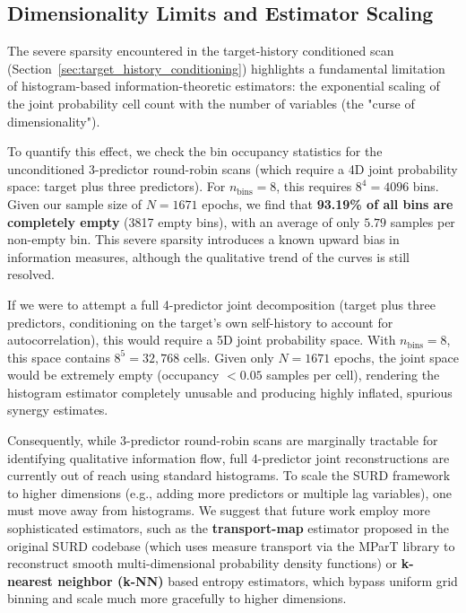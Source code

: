 \documentclass[fleqn,usenatbib]{mnras}
\begin{document}
\subsection{Dimensionality Limits and Estimator Scaling}
\label{sec:dimensionality_limits}

The severe sparsity encountered in the target-history conditioned scan (Section~\ref{sec:target_history_conditioning}) highlights a fundamental limitation of histogram-based information-theoretic estimators: the exponential scaling of the joint probability cell count with the number of variables (the "curse of dimensionality"). 

To quantify this effect, we check the bin occupancy statistics for the unconditioned 3-predictor round-robin scans (which require a 4D joint probability space: target plus three predictors). For $n_{\mathrm{bins}} = 8$, this requires $8^4 = 4096$ bins. Given our sample size of $N = 1671$ epochs, we find that \textbf{93.19\% of all bins are completely empty} (3817 empty bins), with an average of only $5.79$ samples per non-empty bin. This severe sparsity introduces a known upward bias in information measures, although the qualitative trend of the curves is still resolved.

If we were to attempt a full 4-predictor joint decomposition (target plus three predictors, conditioning on the target's own self-history to account for autocorrelation), this would require a 5D joint probability space. With $n_{\mathrm{bins}} = 8$, this space contains $8^5 = 32,768$ cells. Given only $N=1671$ epochs, the joint space would be extremely empty (occupancy $<0.05$ samples per cell), rendering the histogram estimator completely unusable and producing highly inflated, spurious synergy estimates.

Consequently, while 3-predictor round-robin scans are marginally tractable for identifying qualitative information flow, full 4-predictor joint reconstructions are currently out of reach using standard histograms. To scale the SURD framework to higher dimensions (e.g., adding more predictors or multiple lag variables), one must move away from histograms. We suggest that future work employ more sophisticated estimators, such as the \textbf{transport-map} estimator proposed in the original SURD codebase \cite{MartinezSanchez2024SURD} (which uses measure transport via the MParT library to reconstruct smooth multi-dimensional probability density functions) or \textbf{k-nearest neighbor (k-NN)} based entropy estimators, which bypass uniform grid binning and scale much more gracefully to higher dimensions.
\end{document}
